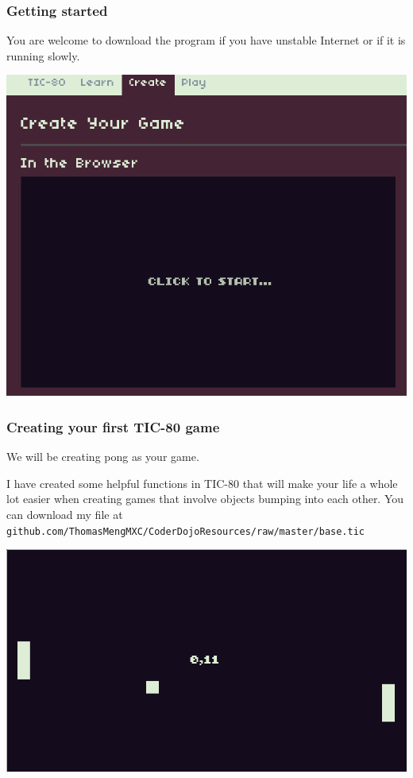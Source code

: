 \documentclass{beamer}
\begin{document}
\begin{frame}
	\frametitle{Getting started}
	You are welcome to download the program if you have unstable Internet or if it is running slowly.
	\begin{center}
		\includegraphics[width=0.7\linewidth]{starting.png}
	\end{center}
\end{frame}

\begin{frame}
	\frametitle{Creating your first TIC-80 game}
	We will be creating pong as your game.
	
	I have created some helpful functions in TIC-80 that will make your life a whole lot easier when creating games that involve objects bumping into each other. You can download my file at \small\lstinline{github.com/ThomasMengMXC/CoderDojoResources/raw/master/base.tic}
	\begin{center}
		\includegraphics[width=0.7\linewidth]{pong.png}
	\end{center}
\end{frame}
\end{document}
